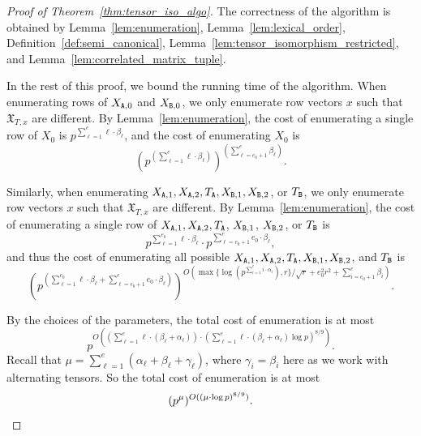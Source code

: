 \begin{proof}[Proof of Theorem~\ref{thm:tensor_iso_algo}]
The correctness of the algorithm is obtained by Lemma~\ref{lem:enumeration}, Lemma~\ref{lem:lexical_order}, Definition~\ref{def:semi_canonical},  Lemma~\ref{lem:tensor_isomorphism_restricted}, and Lemma~\ref{lem:correlated_matrix_tuple}.

In the rest of this proof, we bound the running time of the algorithm. When enumerating rows of $X_{\mathtt{A}, 0}$ and $X_{\mathtt{B}, 0}$, we only enumerate row vectors $x$ such that $\mathfrak{X}_{T, x}$ are different. 
By Lemma~\ref{lem:enumeration}, the cost of enumerating a single row of $X_0$ is $p^{\sum_{\ell = 1}^{e} \ell \cdot \beta_\ell}$, and the cost of enumerating $X_0$ is 
\[\left(p^{(\sum_{\ell = 1}^{e} \ell \cdot \beta_\ell)} \right)^{(\sum_{\ell = e_0 + 1}^{e} \beta_\ell)}.\]


Similarly, when enumerating 
$X_{\mathtt{A}, 1}, X_{\mathtt{A}, 2}, T_{\mathtt{A}}, X_{\mathtt{B}, 1}, X_{\mathtt{B}, 2}$, or $T_{\mathtt{B}}$, we only enumerate row vectors $x$ such that $\mathfrak{X}_{T, x}$ are different.
By Lemma~\ref{lem:enumeration},
the cost of enumerating a single row of $X_{\mathtt{A}, 1}, X_{\mathtt{A}, 2}, T_{\mathtt{A}}$, $X_{\mathtt{B}, 1}$, $X_{\mathtt{B}, 2}$, or $T_{\mathtt{B}}$ is \[p^{\sum_{\ell = 1}^{e_0} \ell \cdot \beta_\ell} \cdot p^{\sum_{\ell = e_0 + 1}^{e} e_0 \cdot \beta_\ell},\] and thus the cost of enumerating all possible $X_{\mathtt{A}, 1}, X_{\mathtt{A}, 2}, T_{\mathtt{A}}, X_{\mathtt{B}, 1}, X_{\mathtt{B}, 2}$, and $T_{\mathtt{B}}$  is 
\[\left(p^{(\sum_{\ell = 1}^{e_0} \ell \cdot \beta_\ell + \sum_{\ell = e_0 + 1}^{e} e_0 \cdot \beta_\ell)}\right)^{ O(\max\{\log(p^{\sum_{i = 1}^{e} i \cdot \alpha_i}), r\}/ \sqrt{r} + e_0^2 r^2 + \sum_{i = e_0 + 1}^{e} \beta_i)}.\]


By the choices of the parameters, 
the total cost of enumeration is at most 
\[p^{O((\sum_{\ell = 1}^{e} \ell \cdot (\beta_\ell + \alpha_\ell)) \cdot(\sum_{\ell = 1}^{e} \ell \cdot (\beta_\ell + \alpha_\ell)\log p)^{8/9})}.\]
Recall that $\mu = \sum_{\ell = 1}^e (\alpha_\ell + \beta_\ell + \gamma_\ell)$, %
where $\gamma_i=\beta_i$ here as we work with alternating tensors. 
So the total cost of enumeration is at most 
\[(p^\mu)^{O(( \mu \cdot \log p)^{8/9})}. \qedhere\]
\end{proof}
